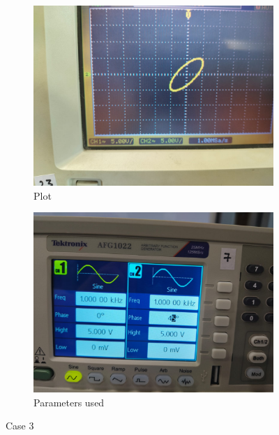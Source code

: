 \documentclass[a4paper,12pt]{article}
\begin{document}
\begin{figure}[htbp]
    \centering
    \begin{subfigure}[b]{0.45\textwidth}
        \centering
        \includegraphics[width=\linewidth]{figs/3/plot3.jpeg}
        \caption{Plot}
        \label{fig:image1}
    \end{subfigure}
    \hfill
    \begin{subfigure}[b]{0.45\textwidth}
        \centering
        \includegraphics[width=\linewidth]{figs/3/para3.jpeg}
        \caption{Parameters used}
        \label{fig:image2}
    \end{subfigure}
    \caption{Case 3}
    \label{fig:sidebyside}
\end{figure}
\end{document}
